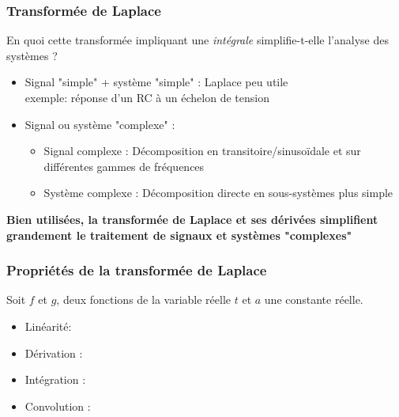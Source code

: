 \documentclass{beamer}
\begin{document}
\begin{frame}
\frametitle{Transformée de Laplace}
En quoi cette transformée impliquant une \textit{intégrale} simplifie-t-elle l'analyse des systèmes ?
\vspace{0.3cm}
\begin{itemize}
\item  Signal "simple" + système "simple" : Laplace peu utile\\
\vspace{0.1cm}
	\hspace{0.2cm}\small{exemple: réponse d'un RC à un échelon de tension}
	\vspace{0.3cm}
\item \normalsize{ Signal ou système "complexe" :}
\begin{itemize}
\item Signal complexe : Décomposition en transitoire/sinusoïdale et sur différentes gammes de fréquences 
\vspace{0.3cm}
\item Système complexe : Décomposition directe en sous-systèmes plus simple
\end{itemize}
\end{itemize}
\vspace{0.3cm}
\textbf{Bien utilisées, la transformée de Laplace et ses dérivées simplifient grandement le traitement de signaux et systèmes "complexes"}
\end{frame}


\begin{frame}
\frametitle{Propriétés de la transformée de Laplace}
Soit $f$ et $g$, deux fonctions de la variable réelle $t$ et $a$ une constante réelle. \\
\vspace{0.3cm}
\begin{itemize}
\item<2-> Linéarité: 
\vspace{0.4cm}
\item<4-> Dérivation : 
\vspace{0.4cm}
\item<5-> Intégration : 
\vspace{0.4cm}
\item<7-> Convolution : 
\end{itemize}

\end{frame}
\end{document}
